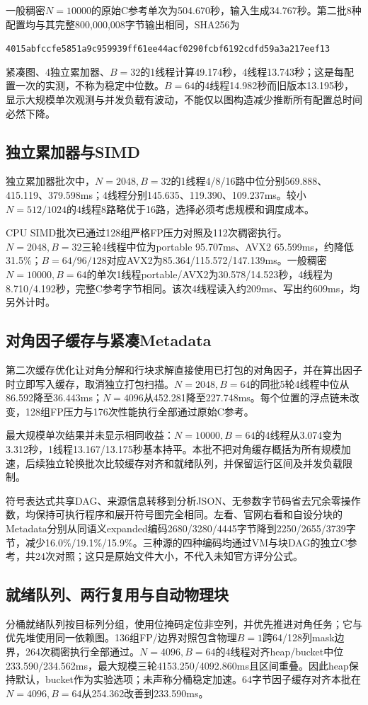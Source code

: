 \documentclass[UTF8,a4paper,11pt]{ctexart}
\begin{document}
一般稠密$N=10000$的原始C参考单次为504.670秒，输入生成34.767秒。第二批8种配置均与其完整800,000,008字节输出相同，SHA256为
\begin{center}\scriptsize\texttt{4015abfccfe5851a9c959939ff61ee44acf0290fcbf6192cdfd59a3a217eef13}\end{center}
紧凑图、4独立累加器、$B=32$的1线程计算49.174秒，4线程13.743秒；这是每配置一次的实测，不称为稳定中位数。$B=64$的4线程14.982秒而旧版本13.195秒，显示大规模单次观测与并发负载有波动，不能仅以图构造减少推断所有配置总时间必然下降。

\subsection{独立累加器与SIMD}
独立累加器批次中，$N=2048,B=32$的1线程4/8/16路中位分别569.888、415.119、379.598ms；4线程分别145.635、119.390、109.237ms。较小$N=512/1024$的4线程8路略优于16路，选择必须考虑规模和调度成本。

CPU SIMD批次已通过128组严格FP压力对照及112次稠密执行。$N=2048,B=32$三轮4线程中位为portable 95.707ms、AVX2 65.599ms，约降低31.5\%；$B=64/96/128$对应AVX2为85.364/115.572/147.139ms。一般稠密$N=10000,B=64$的单次1线程portable/AVX2为30.578/14.523秒，4线程为8.710/4.192秒，完整C参考字节相同。该次4线程读入约209ms、写出约609ms，均另外计时。

\subsection{对角因子缓存与紧凑Metadata}
第二次缓存优化让对角分解和行块求解直接使用已打包的对角因子，并在算出因子时立即写入缓存，取消独立打包扫描。$N=2048,B=64$的同批5轮4线程中位从86.592降至36.443ms；$N=4096$从452.281降至227.748ms。每个位置的浮点链未改变，128组FP压力与176次性能执行全部通过原始C参考。

最大规模单次结果并未显示相同收益：$N=10000,B=64$的4线程从3.074变为3.312秒，1线程13.167/13.175秒基本持平。本批不把对角缓存概括为所有规模加速，后续独立轮换批次比较缓存对齐和就绪队列，并保留运行区间及并发负载限制。

符号表达式共享DAG、来源信息转移到分析JSON、无参数字节码省去冗余零操作数，均保持可执行程序和展开符号图完全相同。左看、官网右看和自设分块的Metadata分别从同语义expanded编码2680/3280/4445字节降到2250/2655/3739字节，减少16.0\%/19.1\%/15.9\%。三种源的四种编码均通过VM与块DAG的独立C参考，共24次对照；这只是原始文件大小，不代入未知官方评分公式。

\subsection{就绪队列、两行复用与自动物理块}
分桶就绪队列按目标列分组，使用位掩码定位非空列，并优先推进对角任务；它与优先堆使用同一依赖图。136组FP/边界对照包含物理$B=1$跨64/128列mask边界，264次稠密执行全部通过。$N=4096,B=64$的4线程对齐heap/bucket中位233.590/234.562ms，最大规模三轮4153.250/4092.860ms且区间重叠。因此heap保持默认，bucket作为实验选项；未声称分桶稳定加速。64字节因子缓存对齐本批在$N=4096,B=64$从254.362改善到233.590ms。
\end{document}
